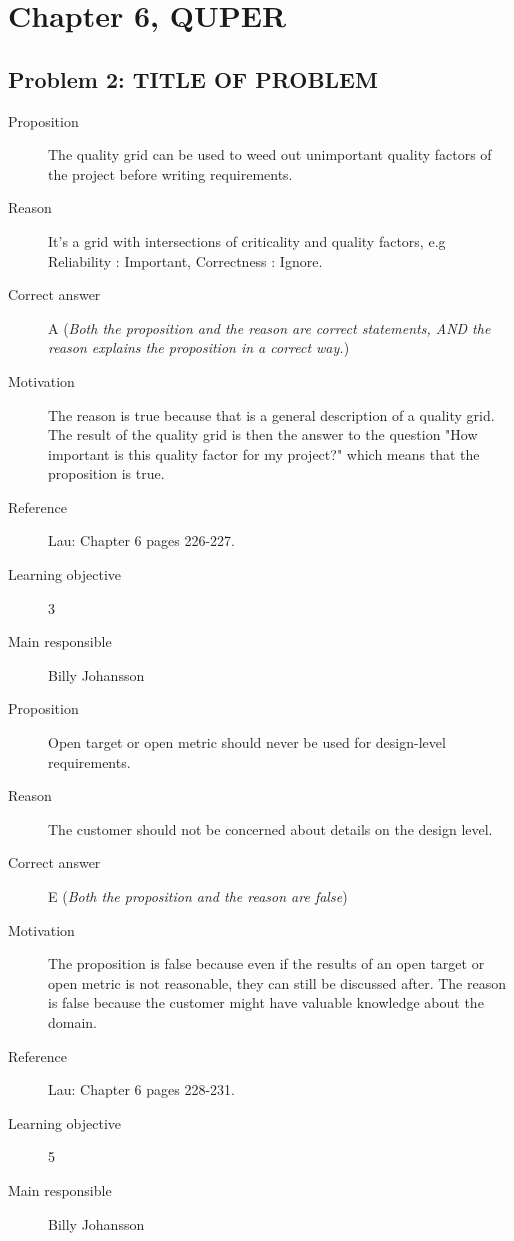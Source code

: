 \documentclass[10pt,a4paper]{article}
\begin{document}
\section*{Chapter 6, QUPER}
\subsection*{Problem 2: TITLE OF PROBLEM}
\begin{description}
\item[Proposition] The quality grid can be used to weed out unimportant quality factors of the project before writing requirements.
\item[Reason] It's a grid with intersections of criticality and quality factors, e.g Reliability : Important, Correctness : Ignore.
\item[Correct answer] A (\textit{Both the proposition and the reason are correct statements,
AND the reason explains the proposition in a correct way.})
\item[Motivation] The reason is true because that is a general description of a quality grid. The result of the quality grid is then the answer to the question "How important is this quality factor for my project?" which means that the proposition is true. 
\item[Reference] Lau: Chapter 6 pages 226-227.
\item[Learning objective] 3
\item[Main responsible] Billy Johansson
\end{description}

\begin{description}
\item[Proposition] Open target or open metric should never be used for design-level requirements. 
\item[Reason] The customer should not be concerned about details on the design level. 
\item[Correct answer] E (\textit{Both the proposition and the reason are false})
\item[Motivation] The proposition is false because even if the results of an open target or open metric is not reasonable, they can still be discussed after. The reason is false because the customer might have valuable knowledge about the domain.
\item[Reference] Lau: Chapter 6 pages 228-231.
\item[Learning objective] 5
\item[Main responsible] Billy Johansson
\end{description}
\end{document}
